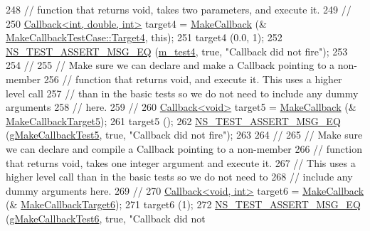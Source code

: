 \begin{DoxyCode}
248   \textcolor{comment}{// function that returns void, takes two parameters, and execute it.}
249   \textcolor{comment}{//}
250   \hyperlink{classns3_1_1Callback}{Callback<int, double, int>} target4 = \hyperlink{group__makecallbackmemptr_ga9376283685aa99d204048d6a4b7610a4}{MakeCallback} (&
      \hyperlink{classMakeCallbackTestCase_a09bb705d58bb3ec1ea520eb1bbcedda2}{MakeCallbackTestCase::Target4}, \textcolor{keyword}{this});
251   target4 (0.0, 1);
252   \hyperlink{group__testing_ga2a9d78cffb3db8e867c35fff0b698cf5}{NS\_TEST\_ASSERT\_MSG\_EQ} (\hyperlink{classMakeCallbackTestCase_ad9e356702447a8d7afb93fbe0ca6c94f}{m\_test4}, \textcolor{keyword}{true}, \textcolor{stringliteral}{"Callback did not fire"});
253 
254   \textcolor{comment}{//}
255   \textcolor{comment}{// Make sure we can declare and make a Callback pointing to a non-member }
256   \textcolor{comment}{// function that returns void, and execute it.  This uses a higher level call}
257   \textcolor{comment}{// than in the basic tests so we do not need to include any dummy arguments}
258   \textcolor{comment}{// here.}
259   \textcolor{comment}{//}
260   \hyperlink{classns3_1_1Callback}{Callback<void>} target5 = \hyperlink{group__makecallbackmemptr_ga9376283685aa99d204048d6a4b7610a4}{MakeCallback} (&
      \hyperlink{callback-test-suite_8cc_ad3e77ec8c845a4e9ae79add079a2c235}{MakeCallbackTarget5});
261   target5 ();
262   \hyperlink{group__testing_ga2a9d78cffb3db8e867c35fff0b698cf5}{NS\_TEST\_ASSERT\_MSG\_EQ} (\hyperlink{callback-test-suite_8cc_a3c2be6ca31bccf7bf60f4cc218357d0d}{gMakeCallbackTest5}, \textcolor{keyword}{true}, \textcolor{stringliteral}{"Callback did not
       fire"});
263 
264   \textcolor{comment}{//}
265   \textcolor{comment}{// Make sure we can declare and compile a Callback pointing to a non-member }
266   \textcolor{comment}{// function that returns void, takes one integer argument and execute it.}
267   \textcolor{comment}{// This uses a higher level call than in the basic tests so we do not need to }
268   \textcolor{comment}{// include any dummy arguments here.}
269   \textcolor{comment}{//}
270   \hyperlink{classns3_1_1Callback}{Callback<void, int>} target6 = \hyperlink{group__makecallbackmemptr_ga9376283685aa99d204048d6a4b7610a4}{MakeCallback} (&
      \hyperlink{callback-test-suite_8cc_aef81fbc5e9509314c3118040beb00ff1}{MakeCallbackTarget6});
271   target6 (1);
272   \hyperlink{group__testing_ga2a9d78cffb3db8e867c35fff0b698cf5}{NS\_TEST\_ASSERT\_MSG\_EQ} (\hyperlink{callback-test-suite_8cc_ae0eb61fdcd477b3c7667b2f92b3da932}{gMakeCallbackTest6}, \textcolor{keyword}{true}, \textcolor{stringliteral}{"Callback did not
}
\end{DoxyCode}
